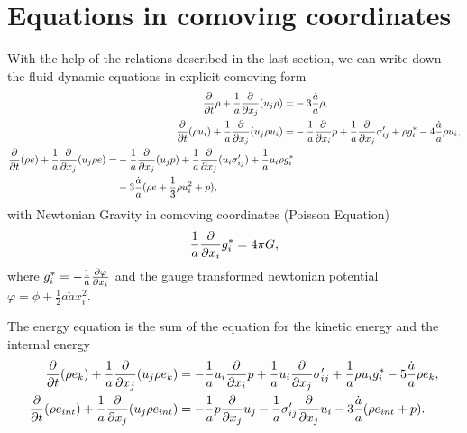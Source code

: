 \section{Equations in comoving coordinates}\label{UEcomoving}
With the help of the relations described in the last section, we can write
down the fluid dynamic equations in explicit comoving form
\begin{align}
\frac{\partial}{\partial t}\rho + \frac{1}{a}\frac{\partial}{\partial x_j}(u_j \rho) =& -3\frac{\dot{a}}{a}\rho , \label{eq:commass}\\
\frac{\partial}{\partial t}(\rho u_i) + \frac{1}{a}\frac{\partial}{\partial x_j}(u_j \rho u_i) =& 
-\frac{1}{a}\frac{\partial}{\partial x_i}p + \frac{1}{a}\frac{\partial}{\partial x_j}\sigma'_{ij} +\rho g^*_i -4\frac{\dot{a}}{a} \rho u_i,
\label{eq:commom}
\\
\begin{split}
\frac{\partial}{\partial t}(\rho e) + \frac{1}{a}\frac{\partial}{\partial x_j}(u_j \rho e) =& 
-\frac{1}{a}\frac{\partial}{\partial x_j}(u_j p) + \frac{1}{a}\frac{\partial}{\partial x_j}(u_i \sigma'_{ij}) + \frac{1}{a} u_i \rho g^*_i \\ 
&- 3 \frac{\dot{a}}{a}(\rho e +\frac{1}{3}\rho u^2_i+p),\label{eq:cometot}
\end{split}
\end{align}
with Newtonian Gravity in comoving coordinates (Poisson Equation)
\begin{align}
\frac{1}{a}\frac{\partial}{\partial x_i}g^*_i=4\pi G,
\end{align}
where 
$g_i^*=-\frac{1}{a}\frac{\partial \varphi}{\partial x_i}$ and the gauge transformed
newtonian potential $\varphi=\phi+\frac{1}{2}a\ddot{a}x_i^2$.

The energy equation is the sum of the equation for the kinetic energy and the
internal energy
\begin{align}
\frac{\partial}{\partial t}(\rho e_k)+\frac{1}{a}\frac{\partial}{\partial x_j}(u_j \rho e_k) &= -\frac{1}{a} u_i \frac{\partial}{\partial x_i}p
+\frac{1}{a} u_i \frac{\partial}{\partial x_j}\sigma'_{ij}+\frac{1}{a}\rho u_i g^*_i-5\frac{\dot{a}}{a}\rho e_k,\\
\frac{\partial}{\partial t}(\rho e_{int})+\frac{1}{a}\frac{\partial}{\partial x_j}(u_j \rho e_{int})&=
-\frac{1}{a} p \frac{\partial}{\partial x_j}u_j -\frac{1}{a} \sigma'_{ij}\frac{\partial}{\partial x_j}u_i- 3\frac{\dot{a}}{a}(\rho e_{int} +p).
\end{align}

